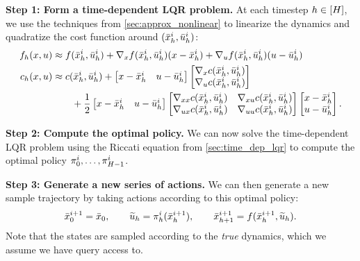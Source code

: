 \documentclass[\main/main]{subfiles}
\begin{document}
\textbf{Step 1: Form a time-dependent LQR problem.}
At each timestep $h \in [H]$, we use the techniques from \autoref{sec:approx_nonlinear} to linearize the dynamics and quadratize the cost function around $(\bar {x}^i_h, \bar {u}^i_h)$:
\begingroup
\newcommand{\iter}[1]{\bar {#1}^i_\hi}
\newcommand{\grad}[2]{\nabla_{#2} #1(\iter \st, \iter \act)}
\begin{align*}
    f_\hi(\st, \act) &\approx f(\iter \st, \iter \act) + \grad f \st (\st - \iter \st) + \grad f \act (\act - \iter \act) \\
    c_\hi(\st, \act) &\approx c(\iter \st, \iter \act) + \begin{bmatrix}
        \st - \iter \st & \act - \iter \act
    \end{bmatrix} \begin{bmatrix}
        \grad c \st \\
        \grad c \act
    \end{bmatrix} \\
    &\qquad + \frac{1}{2} \begin{bmatrix}
        \st - \iter \st & \act - \iter \act
    \end{bmatrix} \begin{bmatrix}
        \nabla_{\st \st} c(\iter \st, \iter \act) & \nabla_{\st \act} c(\iter \st, \iter \act) \\
        \nabla_{\act \st} c(\iter \st, \iter \act) & \nabla_{\act \act} c(\iter \st, \iter \act)
    \end{bmatrix}
    \begin{bmatrix}
        \st - \iter \st \\
        \act - \iter \act
    \end{bmatrix}.
\end{align*}
\endgroup

\textbf{Step 2: Compute the optimal policy.}
We can now solve the time-dependent LQR problem using the Riccati equation from \autoref{sec:time_dep_lqr} to compute the optimal policy $\pi^i_0, \dots, \pi^i_{H-1}$.

\textbf{Step 3: Generate a new series of actions.}
We can then generate a new sample trajectory by taking actions according to this optimal policy: \[
    \bar {x}^{i+1}_0 = \bar {x}_0, \qquad \widetilde {u}_h = \pi^i_h(\bar {x}^{i+1}_h), \qquad \bar {x}^{i+1}_{h+1} = f(\bar {x}^{i+1}_h, \widetilde {u}_h).
\]
Note that the states are sampled according to the \emph{true} dynamics, which we assume we have query access to.
\end{document}
